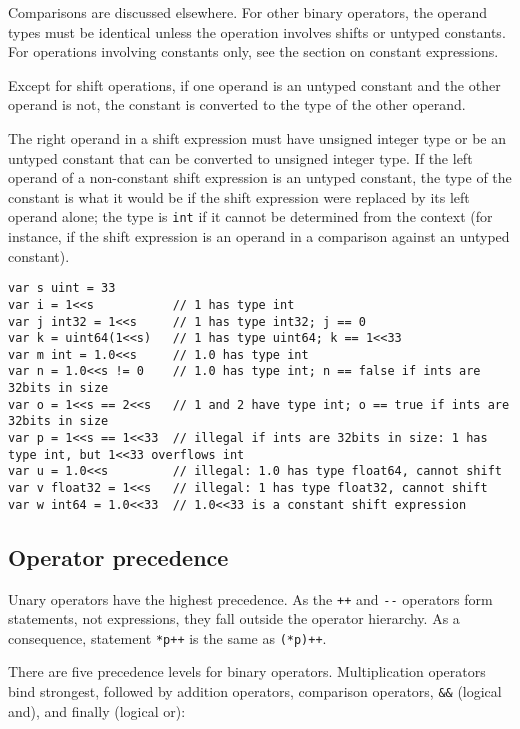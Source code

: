 {Comparisons are discussed elsewhere.
For other binary operators, the operand types must be
identical unless the operation involves
shifts or untyped constants. For operations
involving constants only, see the section on
constant expressions.

Except for shift operations, if one operand is an untyped
constant and the other operand is not, the
constant is converted to the type of the other
operand.

The right operand in a shift expression must have unsigned integer type
or be an untyped constant that can be converted to unsigned integer
type. If the left operand of a non-constant shift expression is an
untyped constant, the type of the constant is what it would be if the
shift expression were replaced by its left operand alone; the type is
\texttt{int} if it cannot be determined from the context (for instance,
if the shift expression is an operand in a comparison against an untyped
constant).

\begin{Verbatim}[frame=single]
var s uint = 33
var i = 1<<s           // 1 has type int
var j int32 = 1<<s     // 1 has type int32; j == 0
var k = uint64(1<<s)   // 1 has type uint64; k == 1<<33
var m int = 1.0<<s     // 1.0 has type int
var n = 1.0<<s != 0    // 1.0 has type int; n == false if ints are 32bits in size
var o = 1<<s == 2<<s   // 1 and 2 have type int; o == true if ints are 32bits in size
var p = 1<<s == 1<<33  // illegal if ints are 32bits in size: 1 has type int, but 1<<33 overflows int
var u = 1.0<<s         // illegal: 1.0 has type float64, cannot shift
var v float32 = 1<<s   // illegal: 1 has type float32, cannot shift
var w int64 = 1.0<<33  // 1.0<<33 is a constant shift expression
\end{Verbatim}

\subsection*{Operator precedence}

Unary operators have the highest precedence. As the \texttt{++} and
\texttt{-{}-} operators form statements, not expressions, they fall
outside the operator hierarchy. As a consequence, statement
\texttt{*p++} is the same as \texttt{(*p)++}.

There are five precedence levels for binary operators. Multiplication
operators bind strongest, followed by addition operators, comparison
operators, \texttt{\&\&} (logical and), and finally
\texttt{\textbar{}\textbar{}} (logical or):

}
